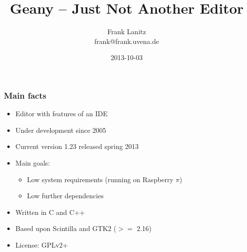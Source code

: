 \documentclass[compress]{beamer}
\title{Geany -- Just Not Another Editor}
\author{Frank Lanitz \\ frank@frank.uvena.de}
\date{2013-10-03}
\begin{document}
	\maketitle{}

	\begin{frame}
		\frametitle{Main facts}
		\begin{itemize}
			\item Editor with features of an IDE
			\item Under development since 2005
			\item Current version 1.23 released spring 2013
			\item Main goals:
				\begin{itemize}
					\item Low system requirements (running on Raspberry $\pi$){}
					\item Low further dependencies
				\end{itemize}
			\item Written in C and C++
			\item Based upon Scintilla and GTK2 ($>=$ 2.16)
			\item License: GPLv2+
		\end{itemize}
	\end{frame}
\end{document}
